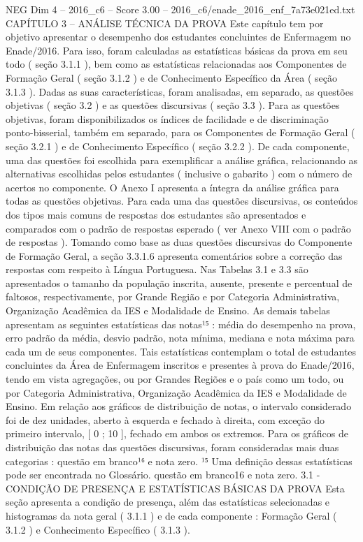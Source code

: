 \begin{textsample}{NEG Dim 4 – 2016\_c6 – Score 3.00 – 2016\_c6/enade\_2016\_enf\_7a73e021ed.txt}  \label{ex:f4_neg_306}
CAPÍTULO 3 – ANÁLISE TÉCNICA DA PROVA Este capítulo tem por objetivo apresentar o desempenho dos estudantes concluintes de Enfermagem no Enade/2016.
Para isso, foram calculadas as estatísticas básicas da prova em seu todo ( seção 3.1.1 ), bem como as estatísticas relacionadas aos Componentes de Formação Geral ( seção 3.1.2 ) e de Conhecimento Específico da Área ( seção 3.1.3 ).
Dadas as suas características, foram analisadas, em separado, as questões objetivas ( seção 3.2 ) e as questões discursivas ( seção 3.3 ).
Para as questões objetivas, foram disponibilizados os índices de facilidade e de discriminação ponto-bisserial, também em separado, para os Componentes de Formação Geral ( seção 3.2.1 ) e de Conhecimento Específico ( seção 3.2.2 ).
De cada componente, uma das questões foi escolhida para exemplificar a análise gráfica, relacionando as alternativas escolhidas pelos estudantes ( inclusive o gabarito ) com o número de acertos no componente.
O Anexo I apresenta a íntegra da análise gráfica para todas as questões objetivas.
Para cada uma das questões discursivas, os conteúdos dos tipos mais comuns de respostas dos estudantes são apresentados e comparados com o padrão de respostas esperado ( ver Anexo VIII com o padrão de respostas ).
Tomando como base as duas questões discursivas do Componente de Formação Geral, a seção 3.3.1.6 apresenta comentários sobre a correção das respostas com respeito à Língua Portuguesa.
Nas Tabelas 3.1 e 3.3 são apresentados o tamanho da população inscrita, ausente, presente e percentual de faltosos, respectivamente, por Grande Região e por Categoria Administrativa, Organização Acadêmica da IES e Modalidade de Ensino.
As demais tabelas apresentam as seguintes estatísticas das notas¹⁵ : média do desempenho na prova, erro padrão da média, desvio padrão, nota mínima, mediana e nota máxima para cada um de seus componentes.
Tais estatísticas contemplam o total de estudantes concluintes da Área de Enfermagem inscritos e presentes à prova do Enade/2016, tendo em vista agregações, ou por Grandes Regiões e o país como um todo, ou por Categoria Administrativa, Organização Acadêmica da IES e Modalidade de Ensino.
Em relação aos gráficos de distribuição de notas, o intervalo considerado foi de dez unidades, aberto à esquerda e fechado à direita, com exceção do primeiro intervalo, [ 0 ; 10 ], fechado em ambos os extremos.
Para os gráficos de distribuição das notas das questões discursivas, foram consideradas mais duas categorias : questão em branco¹⁶ e nota zero. ¹⁵ Uma definição dessas estatísticas pode ser encontrada no Glossário. questão em branco16 e nota zero. 3.1 - CONDIÇÃO DE PRESENÇA E ESTATÍSTICAS BÁSICAS DA PROVA Esta seção apresenta a condição de presença, além das estatísticas selecionadas e histogramas da nota geral ( 3.1.1 ) e de cada componente : Formação Geral ( 3.1.2 ) e Conhecimento Específico ( 3.1.3 ).

\end{textsample}
